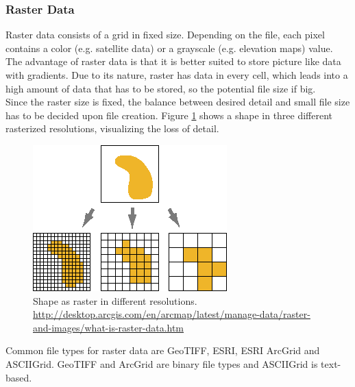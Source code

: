 \subsubsection{Raster Data}
 Raster data consists of a grid in fixed size. Depending on the file, each pixel contains a color (e.g. satellite data)  or a grayscale (e.g. elevation maps) value.\\
 The advantage of raster data is that it is better suited to store picture like data with gradients. Due to its nature, raster has data in every cell, which leads into a high amount of data that has to be stored, so the potential file size if big.\\
 Since the raster size is fixed, the balance between desired detail and small file size has to be decided upon file creation. Figure \ref{img:raster} shows a shape in three different rasterized resolutions, visualizing the loss of detail.
 \begin{figure}[H]
 	\centering\includegraphics[width=.5\textwidth]{res/Vector-Raster}
 	\caption{Shape as raster in different resolutions. \url{http://desktop.arcgis.com/en/arcmap/latest/manage-data/raster-and-images/what-is-raster-data.htm}}
 	\label{img:raster}
 \end{figure}
Common file types for raster data are GeoTIFF, ESRI, ESRI ArcGrid and ASCIIGrid. GeoTIFF and ArcGrid are binary file types and ASCIIGrid is text-based.

